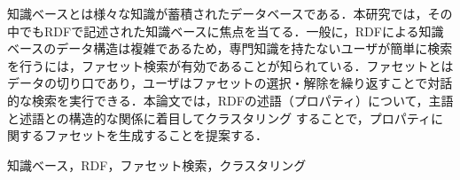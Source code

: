 \documentclass{deimj}
\begin{document}
\pagestyle{empty}
\begin{jabstract}
知識ベースとは様々な知識が蓄積されたデータベースである．本研究では，その中でもRDFで記述された知識ベースに焦点を当てる．一般に，RDFによる知識ベースのデータ構造は複雑であるため，専門知識を持たないユーザが簡単に検索を行うには，ファセット検索が有効であることが知られている．ファセットとはデータの切り口であり，ユーザはファセットの選択・解除を繰り返すことで対話的な検索を実行できる．本論文では，RDFの述語（プロパティ）について，主語と述語との構造的な関係に着目してクラスタリング することで，プロパティに関するファセットを生成することを提案する．
\end{jabstract}
\begin{jkeyword}
知識ベース，RDF，ファセット検索，クラスタリング
\end{jkeyword}
\maketitle

\vspace{-5cm}


\vspace{-3mm}


\vspace{-3mm}


\vspace{-3mm}


\vspace{-3mm}


\vspace{-3mm}


\vspace{-3mm}


\vspace{5mm}

{\footnotesize %

}
\end{document}
